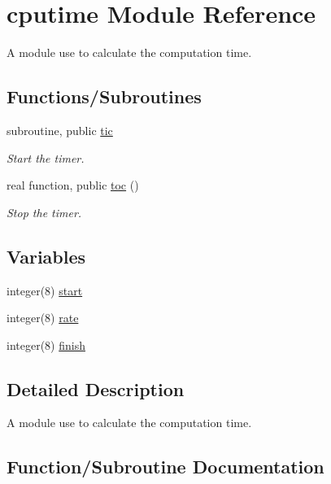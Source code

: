\hypertarget{namespacecputime}{}\section{cputime Module Reference}
\label{namespacecputime}


A module use to calculate the computation time.  


\subsection*{Functions/\+Subroutines}
\begin{DoxyCompactItemize}
\item 
subroutine, public \hyperlink{namespacecputime_a8ddcbcba17e66ece6b29c63b69753684}{tic}
\begin{DoxyCompactList}\small\item\em Start the timer. \end{DoxyCompactList}\item 
real function, public \hyperlink{namespacecputime_a6c69d406a4397d16ea918e4eb035fde9}{toc} ()
\begin{DoxyCompactList}\small\item\em Stop the timer. \end{DoxyCompactList}\end{DoxyCompactItemize}
\subsection*{Variables}
\begin{DoxyCompactItemize}
\item 
integer(8) \hyperlink{namespacecputime_a3c944d7fc4487f41daf6348bf28b1598}{start}
\item 
integer(8) \hyperlink{namespacecputime_a7648112eab2c70c19434f100a9599633}{rate}
\item 
integer(8) \hyperlink{namespacecputime_ad2d439f12d6051a89b5ba23d52aa3e4f}{finish}
\end{DoxyCompactItemize}


\subsection{Detailed Description}
A module use to calculate the computation time. 

\subsection{Function/\+Subroutine Documentation}
\mbox{\label{namespacecputime_a8ddcbcba17e66ece6b29c63b69753684}} 
